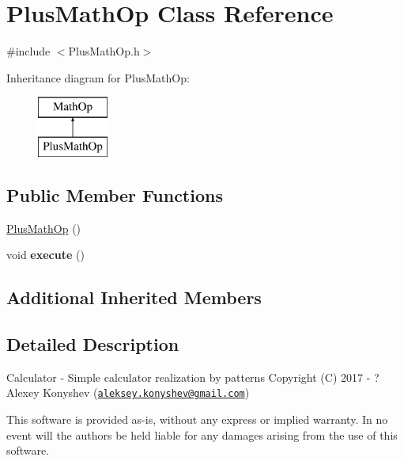 \hypertarget{class_plus_math_op}{}\section{Plus\+Math\+Op Class Reference}
\label{class_plus_math_op}


{\ttfamily \#include $<$Plus\+Math\+Op.\+h$>$}

Inheritance diagram for Plus\+Math\+Op\+:\begin{figure}[H]
\begin{center}
\leavevmode
\includegraphics[height=2.000000cm]{class_plus_math_op}
\end{center}
\end{figure}
\subsection*{Public Member Functions}
\begin{DoxyCompactItemize}
\item 
\hyperlink{class_plus_math_op_a6c6a14c9b1b9a4078d23e9ebe1b0d9d3}{Plus\+Math\+Op} ()
\item 
\hypertarget{class_plus_math_op_af4a0c7be45556dc4c7c78011626ede7b}{}void {\bfseries execute} ()\label{class_plus_math_op_af4a0c7be45556dc4c7c78011626ede7b}

\end{DoxyCompactItemize}
\subsection*{Additional Inherited Members}


\subsection{Detailed Description}
Calculator -\/ Simple calculator realization by patterns Copyright (C) 2017 -\/ ? Alexey Konyshev (\href{mailto:aleksey.konyshev@gmail.com}{\tt aleksey.\+konyshev@gmail.\+com})

This software is provided \textquotesingle{}as-\/is\textquotesingle{}, without any express or implied warranty. In no event will the authors be held liable for any damages arising from the use of this software.

